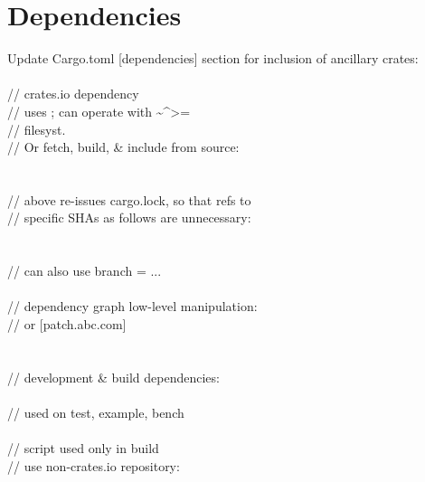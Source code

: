 \section{Dependencies}
Update Cargo.toml [dependencies] section 
for inclusion of ancillary crates: \\[0pt]
\code{[dependencies]} \\
 // crates.io dependency \\
// uses ; can operate with \textasciitilde \textasciicircum * >= \\
 // filesyst. \\
// Or fetch, build, \& include from source: \\
 \\
 \\
// above re-issues cargo.lock, so that refs to \\
// specific SHAs as follows are unnecessary: \\[0pt]
 \\ 
 \\ 
 // can also use branch = ...\\
\code{\}} \\
// dependency graph low-level manipulation:\\[0pt]
 // or [patch.\textquotedbl abc.com\textquotedbl] \\
 \\
 \\
// development \& build dependencies: \\[0pt]
 \\
 // used on test, example, bench \\[0pt]
 \\
 // script used only in build \\
// use non-crates.io repository: \\[0pt]
\code{[registries]} \\
 \\
 \\[0pt]
\code{[dependencies]} \\
 \\
 \\
